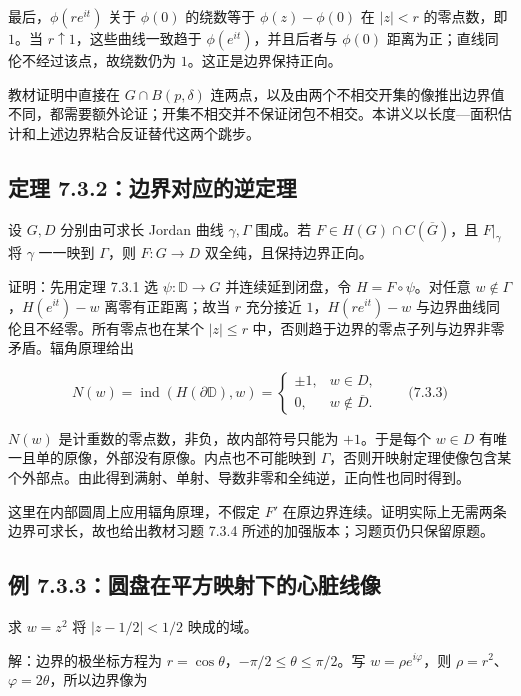 \documentclass[11pt,a4paper]{article}
\begin{document}
最后，\(\phi(re^{it})\) 关于 \(\phi(0)\) 的绕数等于 \(\phi(z)-\phi(0)\)
在 \(|z|<r\) 的零点数，即 \(1\)。当 \(r\uparrow1\)，这些曲线一致趋于
\(\phi(e^{it})\)，并且后者与 \(\phi(0)\)
距离为正；直线同伦不经过该点，故绕数仍为 \(1\)。这正是边界保持正向。

教材证明中直接在 \(G\cap B(p,\delta)\)
连两点，以及由两个不相交开集的像推出边界值不同，都需要额外论证；开集不相交并不保证闭包不相交。本讲义以长度---面积估计和上述边界粘合反证替代这两个跳步。

\subsection{定理 7.3.2：边界对应的逆定理}\label{ch07-s3-heading-3}

设 \(G,D\) 分别由可求长 Jordan 曲线 \(\gamma,\Gamma\) 围成。若
\(F\in H(G)\cap C(\overline G)\)，且 \(F|_\gamma\) 将 \(\gamma\)
一一映到 \(\Gamma\)，则 \(F:G\to D\) 双全纯，且保持边界正向。

证明：先用定理 7.3.1 选 \(\psi:\mathbb D\to G\) 并连续延到闭盘，令
\(H=F\circ\psi\)。对任意 \(w\notin\Gamma\)，\(H(e^{it})-w\)
离零有正距离；故当 \(r\) 充分接近 \(1\)，\(H(re^{it})-w\)
与边界曲线同伦且不经零。所有零点也在某个 \(|z|\le r\)
中，否则趋于边界的零点子列与边界非零矛盾。辐角原理给出

\[
N(w)=\operatorname{ind}(H(\partial\mathbb D),w)
=\begin{cases}\pm1,&w\in D,\\0,&w\notin\overline D.
\end{cases}\qquad\text{(7.3.3)}
\]

\(N(w)\) 是计重数的零点数，非负，故内部符号只能为 \(+1\)。于是每个
\(w\in D\) 有唯一且单的原像，外部没有原像。内点也不可能映到
\(\Gamma\)，否则开映射定理使像包含某个外部点。由此得到满射、单射、导数非零和全纯逆，正向性也同时得到。

这里在内部圆周上应用辐角原理，不假定 \(F'\)
在原边界连续。证明实际上无需两条边界可求长，故也给出教材习题 7.3.4
所述的加强版本；习题页仍只保留原题。

\subsection{例 7.3.3：圆盘在平方映射下的心脏线像}\label{ch07-s3-heading-4}

求 \(w=z^2\) 将 \(|z-1/2|<1/2\) 映成的域。

解：边界的极坐标方程为 \(r=\cos\theta\)，\(-\pi/2\le\theta\le\pi/2\)。写
\(w=\rho e^{i\varphi}\)，则
\(\rho=r^2\)、\(\varphi=2\theta\)，所以边界像为
\end{document}

